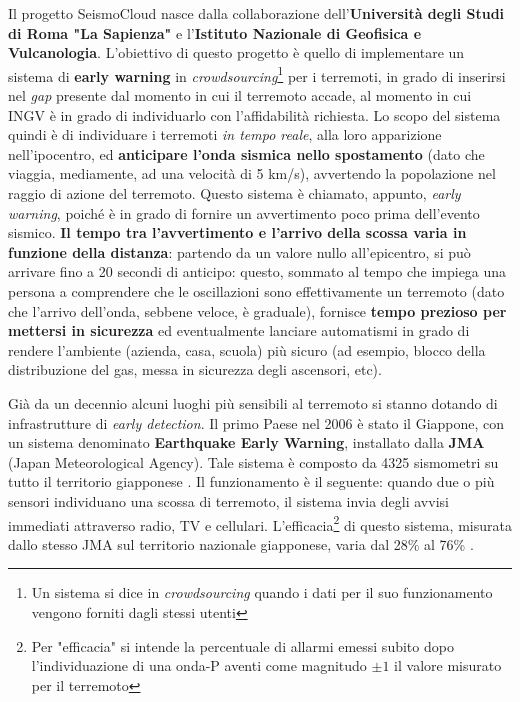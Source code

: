 \documentclass[a4paper,10pt]{memoir}
\begin{document}
Il progetto SeismoCloud nasce dalla collaborazione dell'\textbf{Università degli Studi di Roma "La Sapienza"} e l'\textbf{Istituto Nazionale di Geofisica e Vulcanologia}. L'obiettivo di questo progetto è quello di implementare un sistema di \textbf{early warning} in \textit{crowdsourcing}\footnote{Un sistema si dice in \textit{crowdsourcing} quando i dati per il suo funzionamento vengono forniti dagli stessi utenti} per i terremoti, in grado di inserirsi nel \textit{gap} presente dal momento in cui il terremoto accade, al momento in cui INGV è in grado di individuarlo con l'affidabilità richiesta. Lo scopo del sistema quindi è di individuare i terremoti \textit{in tempo reale}, alla loro apparizione nell'ipocentro, ed \textbf{anticipare l'onda sismica nello spostamento} (dato che viaggia, mediamente, ad una velocità di 5 km/s), avvertendo la popolazione nel raggio di azione del terremoto. Questo sistema è chiamato, appunto, \textit{early warning}, poiché è in grado di fornire un avvertimento poco prima dell'evento sismico. \textbf{Il tempo tra l'avvertimento e l'arrivo della scossa varia in funzione della distanza}: partendo da un valore nullo all'epicentro, si può arrivare fino a 20 secondi di anticipo: questo, sommato al tempo che impiega una persona a comprendere che le oscillazioni sono effettivamente un terremoto (dato che l'arrivo dell'onda, sebbene veloce, è graduale), fornisce \textbf{tempo prezioso per mettersi in sicurezza} ed eventualmente lanciare automatismi in grado di rendere l'ambiente (azienda, casa, scuola) più sicuro (ad esempio, blocco della distribuzione del gas, messa in sicurezza degli ascensori, etc).

Già da un decennio alcuni luoghi più sensibili al terremoto si stanno dotando di infrastrutture di \textit{early detection}. Il primo Paese nel 2006 è stato il Giappone, con un sistema denominato \textbf{Earthquake Early Warning}, installato dalla \textbf{JMA} (Japan Meteorological Agency). Tale sistema è composto da 4325 sismometri su tutto il territorio giapponese \cite{jma}. Il funzionamento è il seguente: quando due o più sensori individuano una scossa di terremoto, il sistema invia degli avvisi immediati attraverso radio, TV e cellulari. L'efficacia\footnote{Per "efficacia" si intende la percentuale di allarmi emessi subito dopo l'individuazione di una onda-P aventi come magnitudo $\pm1$ il valore misurato per il terremoto} di questo sistema, misurata dallo stesso JMA sul territorio nazionale giapponese, varia dal 28\% al 76\% \cite{jma}.
\end{document}
